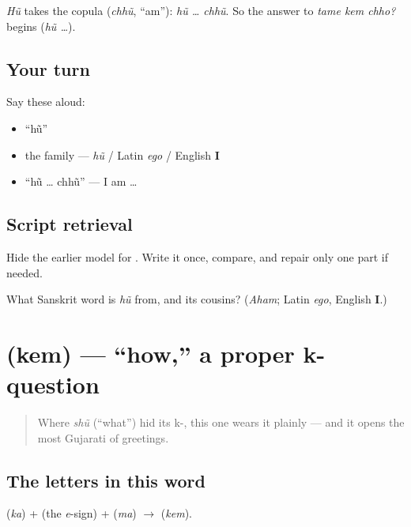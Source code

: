 \begin{grammarlens}[title={Grammar Lens: \textquotedblleft{}I\textquotedblright{} plus the copula}]
\emph{Hũ} takes the copula \textbf{} (\emph{chhũ}, \textquotedblleft{}am\textquotedblright{}): \emph{hũ … chhũ}. So the answer to \emph{tame kem chho?} begins \textbf{} (\emph{hũ …}).
\end{grammarlens}

\subsection*{Your turn}
Say these aloud:

\begin{itemize}
\raggedright
  \item \textquotedblleft{}hũ\textquotedblright{}
  \item the family — \emph{hũ} / Latin \emph{ego} / English \textbf{I}
  \item \textquotedblleft{}hũ … chhũ\textquotedblright{} — I am …
\end{itemize}

\subsection*{Script retrieval}
Hide the earlier model for \textbf{}. Write it once, compare, and repair only one part if needed.

\begin{tcolorbox}[breakable,colback=teal!4,colframe=teal!35!black,title={Before you move on}]
What Sanskrit word is \emph{hũ} from, and its cousins? (\emph{Aham}; Latin \emph{ego}, English \textbf{I}.)
\end{tcolorbox}
\section[\gu{કેમ}]{ (kem) — \textquotedblleft{}how,\textquotedblright{} a proper k- question}

\label{lesson:GU-C03-kem}



\begin{quote}
Where \emph{shũ} (\textquotedblleft{}what\textquotedblright{}) hid its k-, this one wears it plainly — and it opens the most Gujarati of greetings.
\end{quote}

\subsection*{The letters in this word}
\textbf{} (\emph{ka}) + \textbf{} (the \emph{e}-sign) + \textbf{} (\emph{ma}) $\to$ \textbf{} (\emph{kem}).

